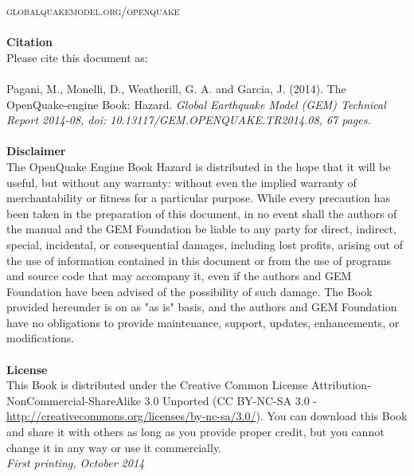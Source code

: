 \documentclass[11pt,fleqn]{book} %
\begin{document}
\noindent \textsc{globalquakemodel.org/openquake}\\ %
\noindent \hfill \\
   {\textbf{Citation}} \hfill \\
   Please cite this document as: \hfill \\
   \hfill \\
   Pagani, M., Monelli, D., Weatherill, G. A. and Garcia, J. (2014). 
   The OpenQuake-engine Book: Hazard. 
   \textit{Global Earthquake Model (GEM) Technical Report 2014-08, 
   doi: 10.13117/\-GEM.OPENQUAKE.\-TR2014.08, 67 pages.} \\
   \hfill \\
\noindent 
\noindent 
   {\bf{Disclaimer}} \hfill \\
   The OpenQuake Engine Book Hazard is distributed in 
   the hope that it will be useful, but without any warranty: without 
   even the implied warranty of merchantability or fitness for a 
   particular purpose. While every 
   precaution has been taken in the preparation of this document, in 
   no event shall the authors of the manual and the GEM Foundation be 
   liable to any party for direct, indirect, special, incidental, or 
   consequential damages, including lost profits, arising out of the 
   use of information contained in this document or from the use of 
   programs and source code that may accompany it, even if the authors 
   and GEM Foundation have been advised of the possibility of such damage. 
   The Book provided hereunder is on as "as is" basis, and the authors 
   and GEM Foundation have no obligations to provide maintenance, support,
   updates, enhancements, or modifications. 
   \hfill \\
   \vspace{0.4cm} \hfill \\
   {\bf{License}} \hfill \\
   This Book is distributed under the Creative Common License 
   Attribution-NonCommercial-ShareAlike 3.0 Unported (CC BY-NC-SA 3.0 - 
   \href{http://creativecommons.org/licenses/by-nc-sa/3.0/}
   {http://creativecommons.org/licenses/by-nc-sa/3.0/}). 
   You can download this Book and share it with 
   others as long as you provide proper credit, but you cannot change 
   it in any way or use it commercially. \hfill \\

\noindent \textit{First printing, October 2014} %
\end{document}
